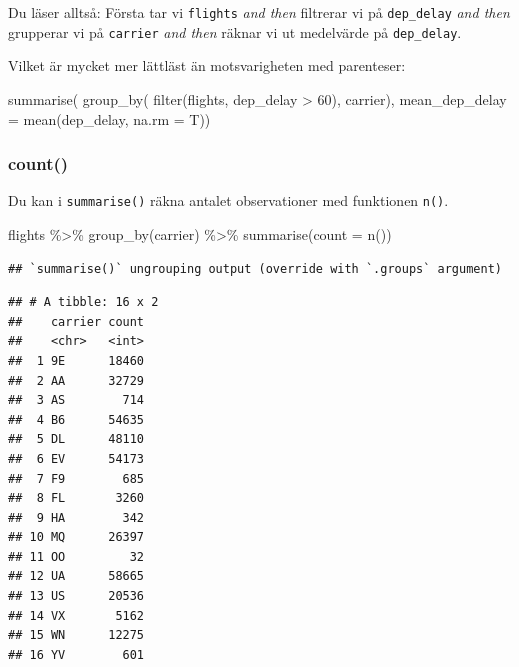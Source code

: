 \documentclass[
]{book}
\newenvironment{Shaded}{\begin{snugshade}}{\end{snugshade}}
\newcommand{\AttributeTok}[1]{\textcolor[rgb]{0.77,0.63,0.00}{#1}}
\newcommand{\DecValTok}[1]{\textcolor[rgb]{0.00,0.00,0.81}{#1}}
\newcommand{\FunctionTok}[1]{\textcolor[rgb]{0.00,0.00,0.00}{#1}}
\newcommand{\NormalTok}[1]{#1}
\newcommand{\SpecialCharTok}[1]{\textcolor[rgb]{0.00,0.00,0.00}{#1}}
\begin{document}
Du läser alltså:
Första tar vi \texttt{flights} \emph{and then}
filtrerar vi på \texttt{dep\_delay} \emph{and then}
grupperar vi på \texttt{carrier} \emph{and then}
räknar vi ut medelvärde på \texttt{dep\_delay}.

Vilket är mycket mer lättläst än motsvarigheten med parenteser:

\begin{Shaded}
\begin{Highlighting}[]
\FunctionTok{summarise}\NormalTok{(}
  \FunctionTok{group\_by}\NormalTok{(}
    \FunctionTok{filter}\NormalTok{(flights, dep\_delay }\SpecialCharTok{\textgreater{}} \DecValTok{60}\NormalTok{),}
\NormalTok{    carrier),}
  \AttributeTok{mean\_dep\_delay =} \FunctionTok{mean}\NormalTok{(dep\_delay, }\AttributeTok{na.rm =}\NormalTok{ T))}
\end{Highlighting}
\end{Shaded}

\hypertarget{count}{%
\subsubsection{count()}\label{count}}

Du kan i \texttt{summarise()} räkna antalet observationer med funktionen \texttt{n()}.

\begin{Shaded}
\begin{Highlighting}[]
\NormalTok{flights }\SpecialCharTok{\%\textgreater{}\%}
  \FunctionTok{group\_by}\NormalTok{(carrier) }\SpecialCharTok{\%\textgreater{}\%}
  \FunctionTok{summarise}\NormalTok{(}\AttributeTok{count =} \FunctionTok{n}\NormalTok{())}
\end{Highlighting}
\end{Shaded}

\begin{verbatim}
## `summarise()` ungrouping output (override with `.groups` argument)
\end{verbatim}

\begin{verbatim}
## # A tibble: 16 x 2
##    carrier count
##    <chr>   <int>
##  1 9E      18460
##  2 AA      32729
##  3 AS        714
##  4 B6      54635
##  5 DL      48110
##  6 EV      54173
##  7 F9        685
##  8 FL       3260
##  9 HA        342
## 10 MQ      26397
## 11 OO         32
## 12 UA      58665
## 13 US      20536
## 14 VX       5162
## 15 WN      12275
## 16 YV        601
\end{verbatim}
\end{document}
